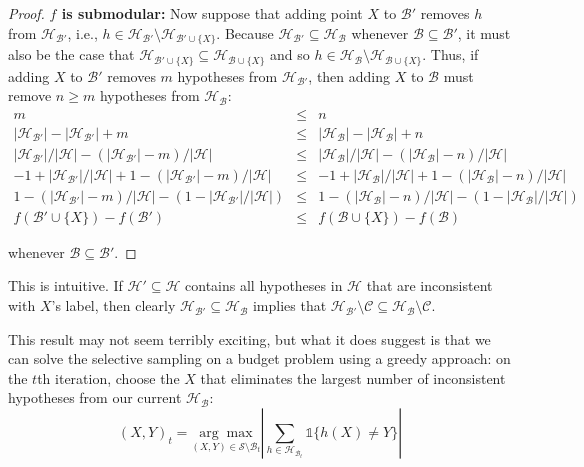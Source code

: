 \begin{proof}
\textbf{$f$ is submodular:} Now suppose that adding point $X$ to $\mathcal{B}'$ removes $h$ from $\mathcal{H}_{\mathcal{B}'}$, i.e., $h \in \mathcal{H}_{\mathcal{B}'} \setminus \mathcal{H}_{\mathcal{B}' \cup \{X\}}$. Because $\mathcal{H}_{\mathcal{B}'} \subseteq \mathcal{H}_{\mathcal{B}}$ whenever $\mathcal{B} \subseteq \mathcal{B}'$, it must also be the case that $\mathcal{H}_{\mathcal{B}' \cup \{X\}} \subseteq \mathcal{H}_{\mathcal{B} \cup \{X\}}$ and so $h \in \mathcal{H}_{\mathcal{B}} \setminus \mathcal{H}_{\mathcal{B} \cup \{X\}}$. Thus, if adding $X$ to $\mathcal{B}'$ removes $m$ hypotheses from $\mathcal{H}_{\mathcal{B}'}$, then adding $X$ to $\mathcal{B}$ must remove $n \geq m$ hypotheses from $\mathcal{H}_{\mathcal{B}}$:
\begin{eqnarray*}
m &\leq& n \\
|\mathcal{H}_{\mathcal{B}'}| - |\mathcal{H}_{\mathcal{B}'}| + m &\leq& |\mathcal{H}_{\mathcal{B}}| - |\mathcal{H}_{\mathcal{B}}| + n \\
|\mathcal{H}_{\mathcal{B}'}|/|\mathcal{H}| - (|\mathcal{H}_{\mathcal{B}'}| - m)/|\mathcal{H}| &\leq& |\mathcal{H}_{\mathcal{B}}|/|\mathcal{H}| - (|\mathcal{H}_{\mathcal{B}}| - n)/|\mathcal{H}| \\
-1 + |\mathcal{H}_{\mathcal{B}'}|/|\mathcal{H}| + 1 - (|\mathcal{H}_{\mathcal{B}'}| - m)/|\mathcal{H}| &\leq& -1 + |\mathcal{H}_{\mathcal{B}}|/|\mathcal{H}| + 1 - (|\mathcal{H}_{\mathcal{B}}| - n)/|\mathcal{H}| \\
1 - (|\mathcal{H}_{\mathcal{B}'}| - m)/|\mathcal{H}| - (1 - |\mathcal{H}_{\mathcal{B}'}|/|\mathcal{H}|) &\leq& 1 - (|\mathcal{H}_{\mathcal{B}}| - n)/|\mathcal{H}| - (1 - |\mathcal{H}_{\mathcal{B}}|/|\mathcal{H}|) \\
f(\mathcal{B}' \cup \{X\}) - f(\mathcal{B}') &\leq& f(\mathcal{B} \cup \{X\}) - f(\mathcal{B})
\end{eqnarray*}

\noindent whenever $\mathcal{B} \subseteq \mathcal{B}'$.
\end{proof}
\noindent This is intuitive. If $\mathcal{H}' \subseteq \mathcal{H}$ contains all hypotheses in $\mathcal{H}$ that are inconsistent with $X$'s label, then clearly $\mathcal{H}_{\mathcal{B}'} \subseteq \mathcal{H}_{\mathcal{B}}$ implies that $\mathcal{H}_{\mathcal{B}'} \setminus \mathcal{C} \subseteq \mathcal{H}_{\mathcal{B}} \setminus \mathcal{C}$.

This result may not seem terribly exciting, but what it does suggest is that we can solve the selective sampling on a budget problem using a greedy approach: on the $t$th iteration, choose the $X$ that eliminates the largest number of inconsistent hypotheses from our current $\mathcal{H}_{\mathcal{B}}$:
\[
(X, Y)_t = \underset{(X,Y) \in \mathcal{S} \setminus \mathcal{B}_t}{\arg\max} \left|\sum_{h \in \mathcal{H}_{\mathcal{B}_t}} \mathds{1}\{h(X) \not= Y\} \right|
\]

